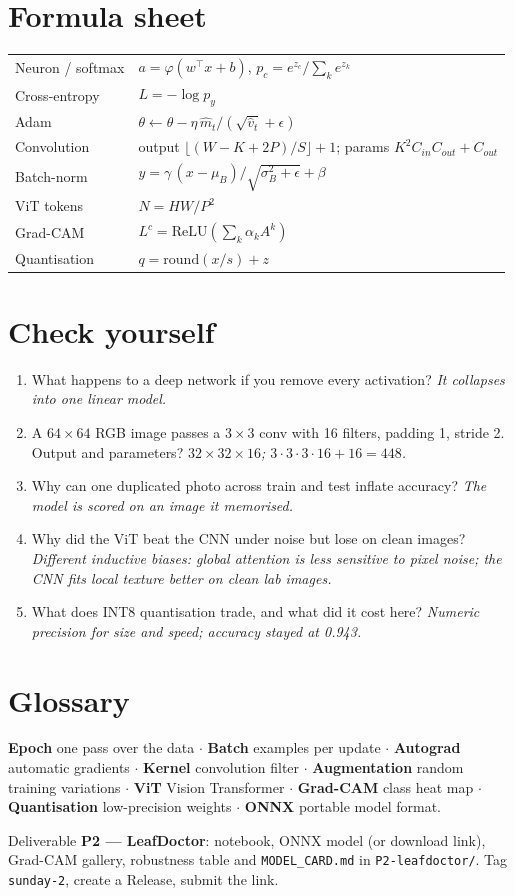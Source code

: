 \documentclass[11pt,a4paper]{article}
\begin{document}
\section*{Formula sheet}
\begin{tabularx}{\linewidth}{@{}l X@{}}
\toprule
Neuron / softmax & $a=\varphi(w^\top x+b)$, \; $p_c=e^{z_c}/\sum_k e^{z_k}$\\
Cross-entropy & $L=-\log p_y$\\
Adam & $\theta\leftarrow\theta-\eta\,\hat m_t/(\sqrt{\hat v_t}+\epsilon)$\\
Convolution & output $\lfloor (W-K+2P)/S\rfloor+1$; \; params $K^2C_{in}C_{out}+C_{out}$\\
Batch-norm & $y=\gamma\,(x-\mu_B)/\sqrt{\sigma_B^2+\epsilon}+\beta$\\
ViT tokens & $N=HW/P^2$\\
Grad-CAM & $L^c=\mathrm{ReLU}(\sum_k\alpha_kA^k)$\\
Quantisation & $q=\mathrm{round}(x/s)+z$\\
\bottomrule
\end{tabularx}

\section*{Check yourself}
\begin{enumerate}
\item What happens to a deep network if you remove every activation? \emph{It collapses into one linear model.}
\item A $64\times64$ RGB image passes a $3\times3$ conv with 16 filters, padding 1, stride 2. Output and parameters? \emph{$32\times32\times16$; $3\cdot3\cdot3\cdot16+16=448$.}
\item Why can one duplicated photo across train and test inflate accuracy? \emph{The model is scored on an image it memorised.}
\item Why did the ViT beat the CNN under noise but lose on clean images? \emph{Different inductive biases: global attention is less sensitive to pixel noise; the CNN fits local texture better on clean lab images.}
\item What does INT8 quantisation trade, and what did it cost here? \emph{Numeric precision for size and speed; accuracy stayed at 0.943.}
\end{enumerate}

\section*{Glossary}
\textbf{Epoch} one pass over the data $\cdot$ \textbf{Batch} examples per update $\cdot$ \textbf{Autograd} automatic gradients $\cdot$ \textbf{Kernel} convolution filter $\cdot$ \textbf{Augmentation} random training variations $\cdot$ \textbf{ViT} Vision Transformer $\cdot$ \textbf{Grad-CAM} class heat map $\cdot$ \textbf{Quantisation} low-precision weights $\cdot$ \textbf{ONNX} portable model format.

\begin{submitbox}
Deliverable \textbf{P2 --- LeafDoctor}: notebook, ONNX model (or download link), Grad-CAM gallery, robustness table and \texttt{MODEL\_CARD.md} in \texttt{P2-leafdoctor/}. Tag \texttt{sunday-2}, create a Release, submit the link.
\end{submitbox}


\end{document}
